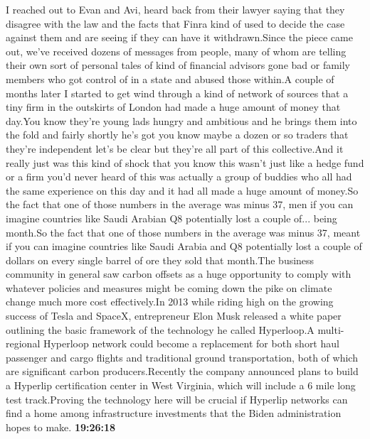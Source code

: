 \documentclass{article}%
\begin{document}
I reached out to Evan and Avi, heard back from their lawyer saying that they disagree with the law and the facts that Finra kind of used to decide the case against them and are seeing if they can have it withdrawn.Since the piece came out, we've received dozens of messages from people, many of whom are telling their own sort of personal tales of kind of financial advisors gone bad or family members who got control of in a state and abused those within.A couple of months later I started to get wind through a kind of network of sources that a tiny firm in the outskirts of London had made a huge amount of money that day.You know they're young lads hungry and ambitious and he brings them into the fold and fairly shortly he's got you know maybe a dozen or so traders that they're independent let's be clear but they're all part of this collective.And it really just was this kind of shock that you know this wasn't just like a hedge fund or a firm you'd never heard of this was actually a group of buddies who all had the same experience on this day and it had all made a huge amount of money.So the fact that one of those numbers in the average was minus 37, men if you can imagine countries like Saudi Arabian Q8 potentially lost a couple of...  being month.So the fact that one of those numbers in the average was minus 37, meant if you can imagine countries like Saudi Arabia and Q8 potentially lost a couple of dollars on every single barrel of ore they sold that month.The business community in general saw carbon offsets as a huge opportunity to comply with whatever policies and measures might be coming down the pike on climate change much more cost effectively.In 2013 while riding high on the growing success of Tesla and SpaceX, entrepreneur Elon Musk released a white paper outlining the basic framework of the technology he called Hyperloop.A multi{-}regional Hyperloop network could become a replacement for both short haul passenger and cargo flights and traditional ground transportation, both of which are significant carbon producers.Recently the company announced plans to build a Hyperlip certification center in West Virginia, which will include a 6 mile long test track.Proving the technology here will be crucial if Hyperlip networks can find a home among infrastructure investments that the Biden administration hopes to make.%
\textbf{19:26:18}%
\newline%
\end{document}
